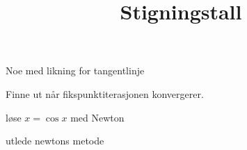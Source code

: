 \documentclass[a4paper,norsk,11pt]{interaktiv}
\title{Stigningstall}
\begin{document}

\maketitle



\begin{oppgave}{1}
Noe med likning for tangentlinje
\end{oppgave}

\begin{oppgave}{2}
Finne ut når fikspunktiterasjonen konvergerer.
\end{oppgave}

\begin{oppgave}{3}
løse $x=\cos x$ med Newton
\end{oppgave}	

\begin{oppgave}{4}
utlede newtons metode
\end{oppgave}
\end{document}
